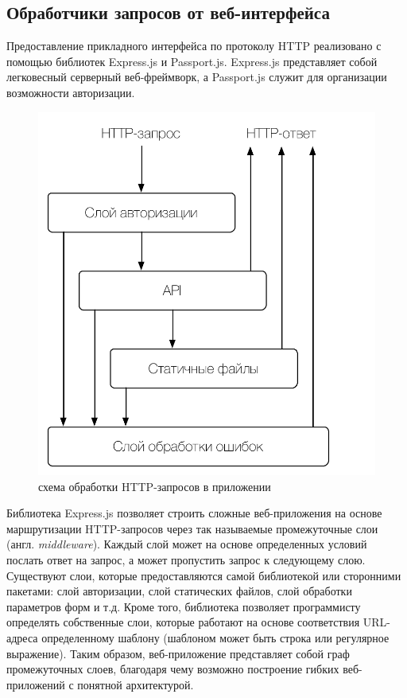 \documentclass[a4paper,14pt,href]{article}
\begin{document}
\subsection{Обработчики запросов от веб-интерфейса}
Предоставление прикладного интерфейса по протоколу HTTP реализовано с помощью библиотек Express.js\cite{ExpressJS} и
Passport.js\cite{PassportJS}. Express.js представляет собой легковесный серверный веб-фреймворк, а Passport.js служит
для организации возможности авторизации.

\begin{figure}[htbp]
\begin{center}
  \includegraphics[scale=0.8]{http-routing.pdf}
    \caption{схема обработки HTTP-запросов в приложении}
    \label{fig:HttpRouting}
\end{center}
\end{figure}

Библиотека Express.js позволяет строить сложные веб-приложения на основе маршрутизации HTTP-запросов через так называемые
промежуточные слои (англ. \textit{middleware}). Каждый слой может на основе определенных условий послать ответ на запрос,
а может пропустить запрос к следующему слою. Существуют слои, которые предоставляются самой библиотекой или
сторонними пакетами: слой авторизации, слой статических файлов, слой обработки параметров форм и т.д. Кроме того,
библиотека позволяет программисту определять собственные слои, которые работают на основе соответствия URL-адреса определенному
шаблону (шаблоном может быть строка или регулярное выражение). Таким образом, веб-приложение представляет собой граф
промежуточных слоев, благодаря чему возможно построение гибких веб-приложений с понятной архитектурой.
\end{document}
